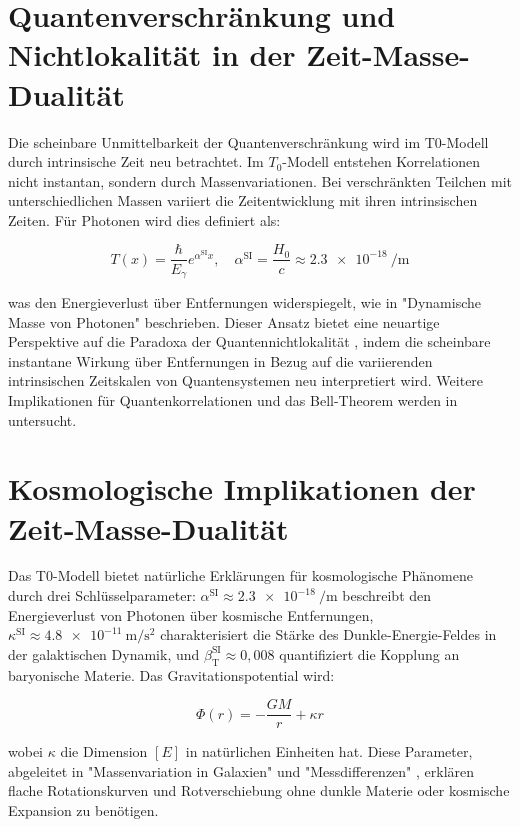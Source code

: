\documentclass[a4paper,12pt]{article}
\newcommand{\Tfield}{T(x)}
\newcommand{\betaT}{\beta_{\text{T}}}
\begin{document}
	\section{Quantenverschränkung und Nichtlokalität in der Zeit-Masse-Dualität}
	
	Die scheinbare Unmittelbarkeit der Quantenverschränkung wird im T0-Modell durch intrinsische Zeit neu betrachtet. Im \(T_0\)-Modell entstehen Korrelationen nicht instantan, sondern durch Massenvariationen. Bei verschränkten Teilchen mit unterschiedlichen Massen variiert die Zeitentwicklung mit ihren intrinsischen Zeiten. Für Photonen wird dies definiert als:
	
	\begin{equation}
		\Tfield = \frac{\hbar}{E_{\gamma}} e^{\alpha^{\text{SI}} x}, \quad \alpha^{\text{SI}} = \frac{H_0}{c} \approx \SI{2,3e-18}{\per\meter}
	\end{equation}
	
	was den Energieverlust über Entfernungen widerspiegelt, wie in "Dynamische Masse von Photonen" \cite{pascher_photons_2025} beschrieben. Dieser Ansatz bietet eine neuartige Perspektive auf die Paradoxa der Quantennichtlokalität \cite{bell1964}, indem die scheinbare instantane Wirkung über Entfernungen in Bezug auf die variierenden intrinsischen Zeitskalen von Quantensystemen neu interpretiert wird. Weitere Implikationen für Quantenkorrelationen und das Bell-Theorem werden in \cite{pascher_feldtheorie_2025} untersucht.
	
	\section{Kosmologische Implikationen der Zeit-Masse-Dualität}
	
	Das T0-Modell bietet natürliche Erklärungen für kosmologische Phänomene durch drei Schlüsselparameter: \(\alpha^{\text{SI}} \approx \SI{2,3e-18}{\per\meter}\) beschreibt den Energieverlust von Photonen über kosmische Entfernungen, \(\kappa^{\text{SI}} \approx \SI{4,8e-11}{\meter\per\second\squared}\) charakterisiert die Stärke des Dunkle-Energie-Feldes in der galaktischen Dynamik, und \(\betaT^{\text{SI}} \approx 0,008\) quantifiziert die Kopplung an baryonische Materie. Das Gravitationspotential wird:
	
	\begin{equation}
		\Phi(r) = -\frac{G M}{r} + \kappa r
	\end{equation}
	
	wobei \(\kappa\) die Dimension \([E]\) in natürlichen Einheiten hat. Diese Parameter, abgeleitet in "Massenvariation in Galaxien" \cite{pascher_galaxies_2025} und "Messdifferenzen" \cite{pascher_messdifferenzen_2025}, erklären flache Rotationskurven und Rotverschiebung ohne dunkle Materie oder kosmische Expansion zu benötigen.
	
\end{document}
